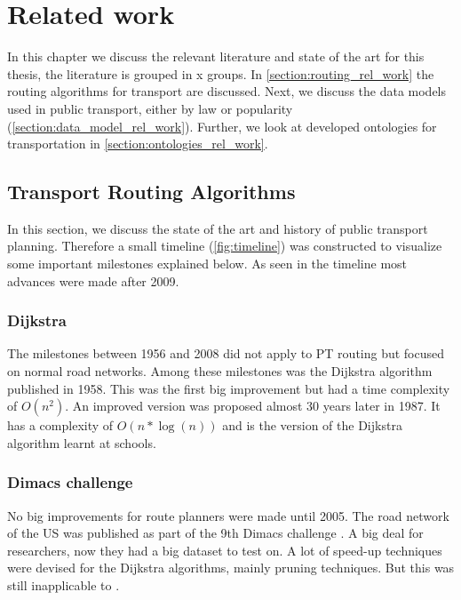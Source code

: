 \chapter{Related work}
\label{chap:rel_work}
In this chapter we discuss the relevant literature and state of the art for this thesis, the literature is grouped in x groups. In \autoref{section:routing_rel_work} the routing algorithms for transport are discussed. Next, we discuss the data models used in public transport, either by law or popularity (\autoref{section:data_model_rel_work}). Further, we look at developed ontologies for transportation in \autoref{section:ontologies_rel_work}.

\section{Transport Routing Algorithms }\label{section:routing_rel_work}



In this section, we discuss the state of the art and history of public transport planning. Therefore a small timeline (\autoref{fig:timeline}) was constructed to visualize some important milestones explained below. As seen in the timeline most advances were made after 2009.

\subsection{Dijkstra}
The milestones between 1956 and 2008 did not apply to PT routing but focused on normal road networks. Among these milestones was the Dijkstra algorithm published in 1958. This was the first big improvement but had a time complexity of $O(n^2)$. An improved version was proposed almost 30 years later in 1987. It has a complexity of $O(n*\log(n))$ and is the version of the Dijkstra algorithm learnt at schools.%
\subsection{Dimacs challenge}
No big improvements for route planners were made until 2005. The road network of the US was published as part of the 9th Dimacs challenge \cite{noauthor_9th_2017}. A big deal for researchers, now they had a big dataset to test on. A lot of speed-up techniques were devised for the Dijkstra algorithms, mainly pruning techniques. But this was still inapplicable to .

